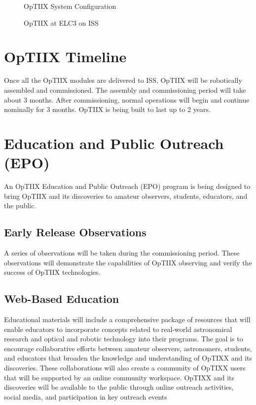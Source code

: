 \begin{figure}[ht!]
\caption{OpTIIX System Configuration}
\end{figure}

\begin{figure}[ht!]
\caption{OpTIIX at ELC3 on ISS}
\end{figure}

\section{OpTIIX Timeline}
Once all the OpTIIX modules are delivered to ISS, OpTIIX will be robotically assembled and commissioned.  The assembly and commissioning period will take about 3 months.  After commissioning, normal operations will begin and continue nominally for 3 months.  OpTIIX is being built to last up to 2 years.

\section{Education and Public Outreach (EPO)}
An OpTIIX Education and Public Outreach (EPO) program is being designed to bring OpTIIX and its discoveries to amateur observers, students, educators, and the public.

\subsection{Early Release Observations}
A series of observations will be taken during the commissioning period.   These observations will demonstrate the capabilities of OpTIIX observing and verify the success of OpTIIX technologies.

\subsection{Web-Based Education}
Educational materials will include a comprehensive package of resources that will enable educators to incorporate concepts related to real-world astronomical research and optical and robotic technology into their programs. The goal is to encourage collaborative efforts between amateur observers, astronomers, students, and educators that broaden the knowledge and understanding of OpTIXX and its discoveries. These collaborations will also create a community of OpTIXX users that will be supported by an online community workspace. OpTIXX and its discoveries will be available to the public through online outreach activities, social media, and participation in key outreach events

